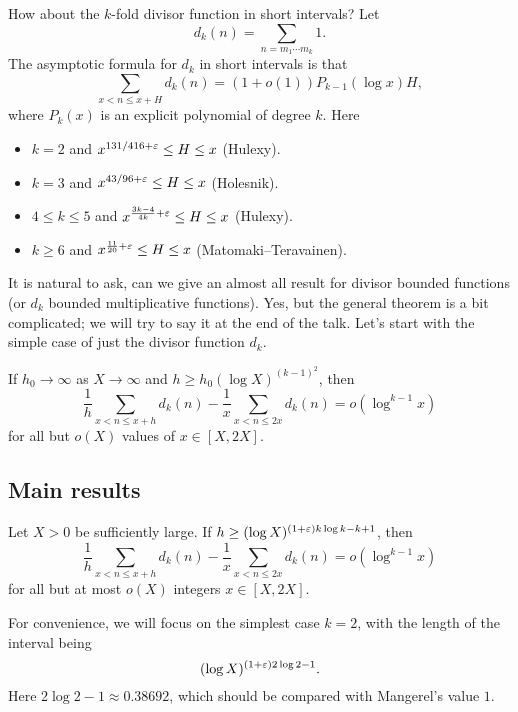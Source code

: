 \documentclass[reqno]{amsart} 
\begin{document}
How about the $k$-fold divisor function in short intervals?  Let
\begin{equation*}
d_k (n ) = \sum_{n = m_1 \dotsb  m_k } 1.
\end{equation*}
The asymptotic formula for $d_k $ in short intervals is that
\begin{equation*}
  \sum_{x < n \leq x + H}
  d_k (n)
  = (1 + o(1))
P_{k - 1} (\log x) H,  
\end{equation*}
where $P_k (x)$ is an explicit polynomial of degree $k$.  Here
\begin{itemize}
\item $k = 2$ and $x^{131/416 + \varepsilon } \leq H \leq x$ (Hulexy).
\item $k = 3$ and $x^{43 / 9 6 + \varepsilon} \leq H \leq x $ (Holesnik).
\item $4 \leq k \leq 5$ and $x^{\frac{3 k - 4}{4 k } + \varepsilon } \leq H \leq x$ (Hulexy).
\item $k \geq 6$ and $x^{\frac{11}{20} + \varepsilon } \leq H \leq x$ (Matomaki--Teravainen).
\end{itemize}

It is natural to ask, can we give an almost all result for divisor bounded functions (or $d_k$ bounded multiplicative functions).  Yes, but the general theorem is a bit complicated; we will try to say it at the end of the talk.  Let's start with the simple case of just the divisor function $d_k $.
\begin{theorem}[Mangerel, 2023]
  If $h_0 \rightarrow \infty $ as $X \rightarrow \infty $ and $h \geq h_0 (\log X)^{(k - 1 )^2 }$, then
  \begin{equation*}
    \frac{1}{h} \sum_{x < n \leq x + h } d_k (n ) - \frac{1}{x}
    \sum_{x < n \leq 2 x } d_k (n)
    = o (\log^{k - 1} x)
  \end{equation*}
  for all but $o (X)$ values of $x \in [X, 2 X]$.
\end{theorem}

\subsection{Main results}
\begin{theorem}[S. 2023]
  Let $X > 0$ be sufficiently large.  If $h \geq (\log X )^{(1 + \varepsilon ) k \log k - k + 1}$, then
  \begin{equation*}
    \frac{1}{h}
    \sum_{x < n \leq x + h}
    d_k (n)
    - \frac{1}{x}
    \sum_{x < n \leq 2 x}
    d_k (n)
    = o (\log^{k - 1} x)
  \end{equation*}
  for all but at most $o(X)$ integers $x \in [X,2 X]$.
\end{theorem}
For convenience, we will focus on the simplest case $k = 2$, with the length of the interval being
\begin{equation*}
  (\log X )^{(1 + \varepsilon ) 2 \log 2 - 1}.
\end{equation*}
Here $2 \log 2 - 1 \approx 0.38692$, which should be compared with Mangerel's value $1$.
\end{document}
